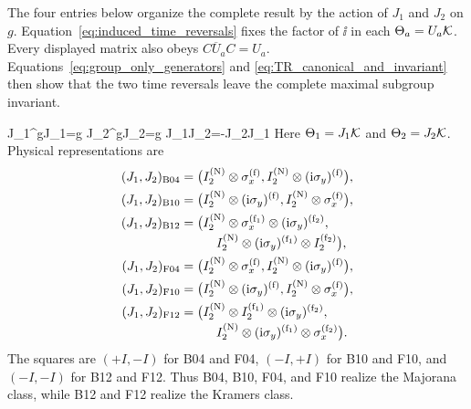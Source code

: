 The four entries below organize the complete result by the action of \(J_1\)
and \(J_2\) on \(g\).  Equation~\eqref{eq:induced_time_reversals} fixes the
factor of \(\ii\) in each \(\Theta_a=U_a\mathcal{K}\).  Every displayed matrix also
obeys \(C\overline U_aC=U_a\).  Equations~\eqref{eq:group_only_generators} and
\eqref{eq:TR_canonical_and_invariant} then show that the two time reversals
leave the complete maximal subgroup invariant.

{J_1^\trans gJ_1=g}
{J_2^\trans gJ_2=g}
{J_1J_2=-J_2J_1}
Here \(\Theta_1=J_1\mathcal{K}\) and \(\Theta_2=J_2\mathcal{K}\).  Physical
representations are
\begin{align*}
(J_1,J_2)_{\rm B04}={}&
 \bigl(I_2^{({\rm N})}\otimes\sigma_x^{({\rm f})},
 I_2^{({\rm N})}\otimes(\mathrm{i}\sigma_y)^{({\rm f})}\bigr),\\
(J_1,J_2)_{\rm B10}={}&
 \bigl(I_2^{({\rm N})}\otimes(\mathrm{i}\sigma_y)^{({\rm f})},
 I_2^{({\rm N})}\otimes\sigma_x^{({\rm f})}\bigr),\\
(J_1,J_2)_{\rm B12}={}&
 \bigl(I_2^{({\rm N})}\otimes\sigma_x^{({\rm f}_1)}
       \otimes(\mathrm{i}\sigma_y)^{({\rm f}_2)},\notag\\[-2pt]
&\hspace{1.5em}
 I_2^{({\rm N})}\otimes(\mathrm{i}\sigma_y)^{({\rm f}_1)}
       \otimes I_2^{({\rm f}_2)}\bigr),\\
(J_1,J_2)_{\rm F04}={}&
 \bigl(I_2^{({\rm N})}\otimes\sigma_x^{({\rm f})},
 I_2^{({\rm N})}\otimes(\mathrm{i}\sigma_y)^{({\rm f})}\bigr),\\
(J_1,J_2)_{\rm F10}={}&
 \bigl(I_2^{({\rm N})}\otimes(\mathrm{i}\sigma_y)^{({\rm f})},
 I_2^{({\rm N})}\otimes\sigma_x^{({\rm f})}\bigr),\\
(J_1,J_2)_{\rm F12}={}&
 \bigl(I_2^{({\rm N})}\otimes I_2^{({\rm f}_1)}
       \otimes(\mathrm{i}\sigma_y)^{({\rm f}_2)},\notag\\[-2pt]
&\hspace{1.5em}
 I_2^{({\rm N})}\otimes(\mathrm{i}\sigma_y)^{({\rm f}_1)}
       \otimes\sigma_x^{({\rm f}_2)}\bigr).
\end{align*}
The squares are \((+I,-I)\) for B04 and F04, \((-I,+I)\) for
B10 and F10, and \((-I,-I)\) for B12 and F12.  Thus B04, B10, F04,
and F10 realize the Majorana class, while B12 and F12 realize the Kramers
class.

